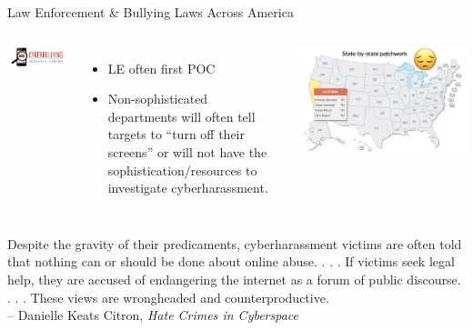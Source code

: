 \documentclass[nobackground,dvipsnames,table,aspectratio=169]{beamer}
\begin{document}
\begin{frame}{Law Enforcement \& Bullying Laws Across America}
    \begin{columns}
            \includegraphics[width=\textwidth]{cyberbullying-research-center}
            \begin{itemize}
                \item LE often first POC
                \item Non-sophisticated departments will often tell targets to “turn off their screens” or will not have the sophistication/resources to investigate cyberharassment.
            \end{itemize}
            \includegraphics[width=\textwidth]{bullying-laws-map}
    \end{columns}
\end{frame}

\begin{frame}{}
    Despite the gravity of their predicaments, cyberharassment victims are often told that nothing can or should be done about online abuse. . . . If victims seek legal help, they are accused of endangering the internet as a forum of public discourse. . . . These views are wrongheaded and counterproductive.\\
    – Danielle Keats Citron, \textit{Hate Crimes in Cyberspace}
\end{frame}
\end{document}
